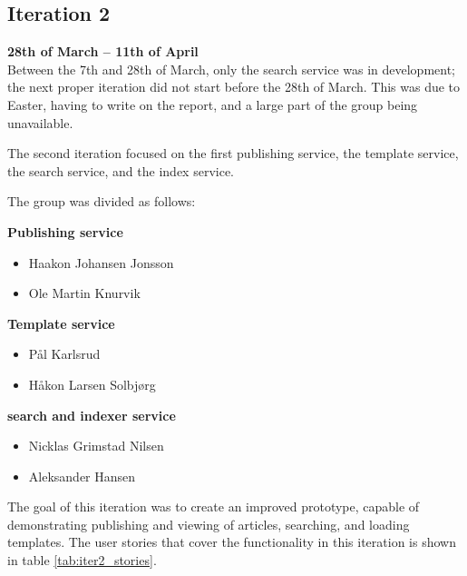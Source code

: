 \subsection{Iteration 2}
\textbf{28th of March -- 11th of April} \\
\noindent Between the 7th and 28th of March, only the search service was in development; the next proper iteration did not start before the 28th of March. This was due to Easter, having to write on the report, and a large part of the group being unavailable.

The second iteration focused on the first publishing service, the template service, the search service, and the index service.

The group was divided as follows:

\begin{flushleft}
\textbf{Publishing service}
\begin{itemize}
\itemsep -0.5em
  \item Haakon Johansen Jonsson
  \item Ole Martin Knurvik
\end{itemize}

\textbf{Template service}
\begin{itemize}
\itemsep -0.5em
  \item Pål Karlsrud
  \item Håkon Larsen Solbjørg
\end{itemize}


\textbf{search and indexer service}
\begin{itemize}
\itemsep -0.5em
  \item Nicklas Grimstad Nilsen
  \item Aleksander Hansen
\end{itemize}

\end{flushleft}

The goal of this iteration was to create an improved prototype, capable of demonstrating publishing and viewing of articles, searching, and loading templates. The user stories that cover the functionality in this iteration is shown in table \ref{tab:iter2_stories}.

